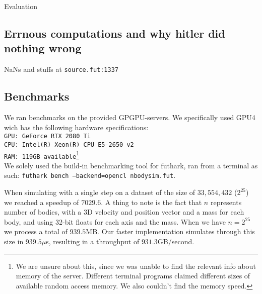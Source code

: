 Evaluation

\subsection{Errnous computations and why hitler did nothing wrong}
NaNs and stuffs at \texttt{source.fut:1337}

\subsection{Benchmarks}
We ran benchmarks on the provided GPGPU-servers. We specifically
used GPU4 wich has the following hardware specifications:\\
\texttt{GPU: GeForce RTX 2080 Ti}\\
\texttt{CPU: Intel(R) Xeon(R) CPU E5-2650 v2}\\
\texttt{RAM: 119GB available}\footnote{We are unsure about this, since we was
unable to find the relevant info about memory of the server. Different terminal
programs claimed different sizes of available random access memory. We also couldn't
find the memory speed.}\\

We solely used the build-in benchmarking tool for futhark, ran from a terminal
as such: \texttt{futhark bench --backend=opencl nbodysim.fut}.

When simulating with a single step on a dataset of the size of $33,554,432$
($2^{25}$) we reached a speedup of $7029.6$. A thing to note is the fact that
$n$ represents number of bodies, with a 3D velocity and position vector and a
mass for each body, and using 32-bit floats for each axis and the mass. When we
have $n = 2^{25}$ we process a total of $939.5$MB. Our faster implementation
simulates through this size in $939.5\mu$s, resulting in a throughput of
$931.3$GB/second.

